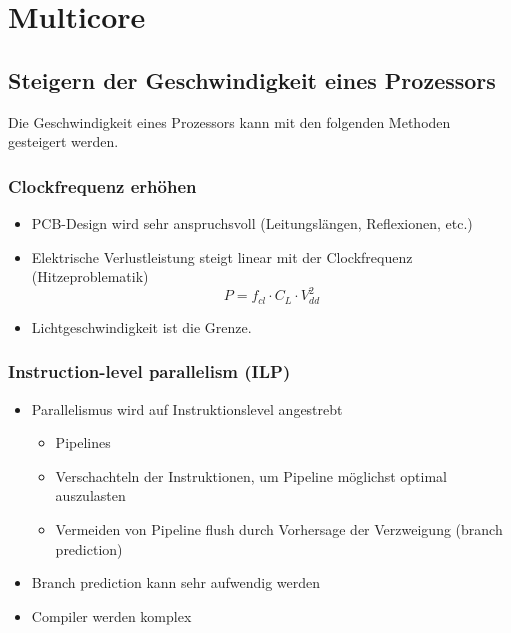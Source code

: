\section{Multicore}
\subsection{Steigern der Geschwindigkeit eines Prozessors}
Die Geschwindigkeit eines Prozessors kann mit den folgenden Methoden gesteigert werden.

\subsubsection{Clockfrequenz erhöhen}
\begin{itemize}
	\item PCB-Design wird sehr anspruchsvoll  (Leitungslängen, Reflexionen, etc.)
	\item Elektrische Verlustleistung steigt linear mit der Clockfrequenz (Hitzeproblematik)
	\begin{equation}
		P = f_{cl} \cdot C_L \cdot V_{dd}^2
	\end{equation}
	\item Lichtgeschwindigkeit ist die Grenze.
\end{itemize}

\subsubsection{Instruction-level parallelism (ILP)}
\begin{itemize}
	\item Parallelismus wird auf Instruktionslevel angestrebt
	\begin{itemize}
		\item Pipelines
		\item Verschachteln der Instruktionen, um Pipeline möglichst optimal auszulasten
		\item Vermeiden von Pipeline flush durch Vorhersage der Verzweigung (branch prediction)
	\end{itemize}
	\item Branch prediction kann sehr aufwendig werden
	\item Compiler werden komplex
\end{itemize}

